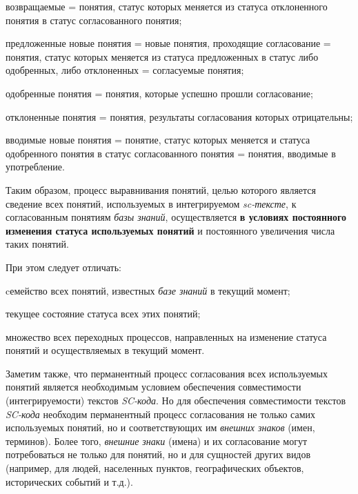 \begin{SCn}
{\begin{scnitemize}
\begin{scnitemizeii}
        \item возвращаемые = понятия, статус которых меняется из статуса отклоненного понятия в статус согласованного понятия;
        \item предложенные новые понятия = новые понятия, проходящие согласование = понятия, статус которых меняется из статуса предложенных в статус либо одобренных, либо отклоненных = согласуемые понятия; 
        \item одобренные понятия = понятия, которые успешно прошли согласование;
        \item отклоненные понятия = понятия, результаты согласования которых отрицательны; 
        \item вводимые новые понятия = понятие, статус которых меняется и статуса одобренного понятия в статус согласованного понятия = понятия, вводимые в употребление.
    \end{scnitemizeii}
\end{scnitemize}

Таким образом, процесс выравнивания понятий, целью которого является сведение всех понятий, используемых в интегрируемом \textit{sc-тексте}, к согласованным понятиям \textit{базы знаний}, осуществляется \textbf{в условиях постоянного изменения статуса используемых понятий} и постоянного увеличения числа таких понятий. 

При этом следует отличать:

\begin{scnitemize}
    \item cемейство всех понятий, известных \textit{базе знаний} в текущий момент;
    \item текущее состояние статуса всех этих понятий;
    \item множество всех переходных процессов, направленных на изменение статуса понятий и осуществляемых в текущий момент.
\end{scnitemize}

Заметим также, что перманентный процесс согласования всех используемых понятий является необходимым условием обеспечения совместимости (интегрируемости) текстов \textit{SC-кода}. Но для обеспечения совместимости текстов \textit{SC-кода} необходим перманентный процесс согласования не только самих используемых понятий, но и соответствующих им \textit{внешних знаков} (имен, терминов). Более того, \textit{внешние знаки} (имена) и их согласование могут потребоваться не только  для понятий, но и для сущностей других видов (например, для людей, населенных пунктов, географических объектов, исторических событий и т.д.).

}
\end{SCn}
